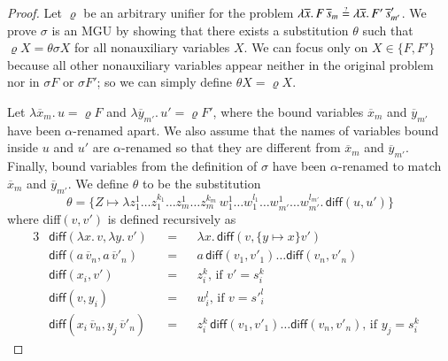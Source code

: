 \begin{proof}
  Let $\varrho$ be an arbitrary unifier for the problem $\lambda
  \overline{x}.\, F \, \overline{s}_m \unif \lambda\overline{x}.\, F' \,
  \overline{s}'_{m'}$. We prove $\sigma$ is an MGU by showing that there exists a substitution
  $\theta$ such that $\varrho X = \theta\sigma X$ for all nonauxiliary variables $X$. 
  We can focus only on $X \in \{F, F'\}$
  because all other nonauxiliary variables
  appear neither in the original problem nor in $\sigma F$ or $\sigma F'$; so we can simply define $\theta X = \varrho X$.


  Let $\lambda \overline{x}_m. \, u = \varrho F$ and  $\lambda \overline{y}_{m'}. \, u' = \varrho{F'}$, where
  the bound variables $\overline{x}_m$ and $\overline{y}_{m'}$ have been $\alpha$-renamed apart. We also assume
  that the names of variables bound inside $u$ and $u'$ are $\alpha$-renamed so that they are different from $\overline{x}_m$ and
  $\overline{y}_{m'}$. Finally, bound variables
  from the definition of $\sigma$ have been $\alpha$-renamed to match $\overline{x}_m$ and $\overline{y}_{m'}$.
  We
  define $\theta$ to be the substitution
  \[\theta = \{ Z \mapsto \lambda z_1^1 \ldots z_1^{k_1} \ldots z_m^1 \ldots z_m^{k_m} \, w_1^{1} \ldots w_1^{l_1} \ldots w_{m'}^1 \ldots  w_{m'}^{l_{m'}}. \, \textsf{diff}(u, u') \}\]
  where \textsf{diff}$(v,v')$ is defined recursively as
  \begin{alignat}{3}
    &\textsf{diff}(\lambda x.\, v, \lambda y.\, v') &&{}={}&& \lambda x. \, \textsf{diff}(v, \{y \mapsto x\}v') \label{diff:alpha} \\
    &\textsf{diff}(a \, \overline{v}_n, a \, \overline{v}'_n) &&=&&  a \, \textsf{diff}(v_1, v'_1) \ldots \textsf{diff}(v_n, v'_n) \label{diff:samehd} \\
    &\textsf{diff}(x_i, v') &&=&&  z_i^k \text{, if $v' = {s}_i^k$ } \label{diff:xi}  \\
    &\textsf{diff}(v, y_i) &&=&&  w_i^l \text{, if $v = {s'}_i^l$ } \label{diff:yi}  \\
    &\textsf{diff}(x_i \, \overline{v}_n, y_j \, \overline{v}'_n) &&=&&  z_i^k \, \textsf{diff}(v_1, v'_1) \ldots \textsf{diff}(v_n, v'_n) \text{, if $y_j = s_i^k $ } \label{diff:xiyj} 
  \end{alignat}


\end{proof}
